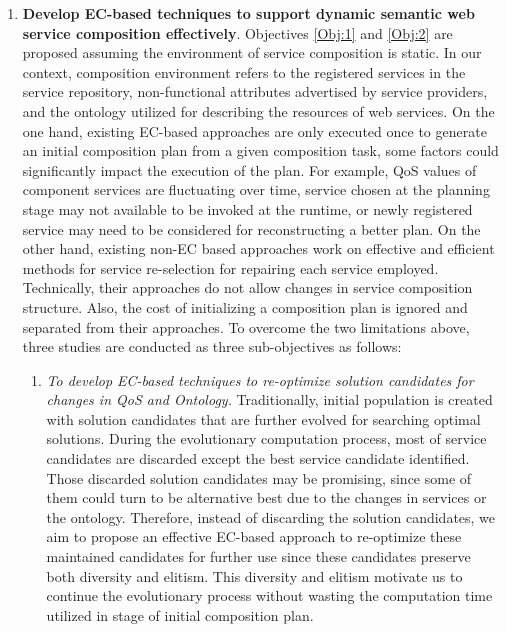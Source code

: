 \begin{enumerate}
\vspace{0.5cm}
 \item \textbf{Develop EC-based techniques to support dynamic semantic web service composition effectively}. Objectives \ref{Obj:1} and \ref{Obj:2} are proposed assuming the environment of service composition is static. In our context, composition environment refers to the registered services in the service repository, non-functional attributes advertised by service providers, and the ontology utilized for describing the resources of web services. On the one hand, existing EC-based approaches are only executed once to generate an initial composition plan from a given composition task, some factors could significantly impact the execution of the plan. For example, QoS values of component services are fluctuating over time, service chosen at the planning stage may not available to be invoked at the runtime, or newly registered service may need to be considered for reconstructing a better plan. On the other hand, existing non-EC based approaches \cite{nasridinov2012qos,salas2006ws,wagner2016robust,yin2010qos} work on effective and efficient methods for service re-selection for repairing each service employed. Technically, their approaches do not allow changes in service composition structure. Also, the cost of initializing a composition plan is ignored and separated from their approaches. To overcome the two limitations above, three studies are conducted as three sub-objectives as follows:

  \begin{enumerate}
 \item \label{Obj:3.1} \emph{To develop EC-based techniques to re-optimize solution candidates for changes in QoS and Ontology.} Traditionally, initial population is created with solution candidates that are further evolved for searching optimal solutions. During the evolutionary computation process, most of service candidates are discarded except the best service candidate identified. Those discarded solution candidates may be promising, since some of them could turn to be alternative best due to the changes in services or the ontology. Therefore, instead of discarding the solution candidates, we aim to propose an effective EC-based approach to re-optimize these maintained candidates for further use since these candidates preserve both diversity and elitism. This diversity and elitism motivate us to continue the evolutionary process without wasting the computation time utilized in stage of initial composition plan.


\end{enumerate}
\end{enumerate}
